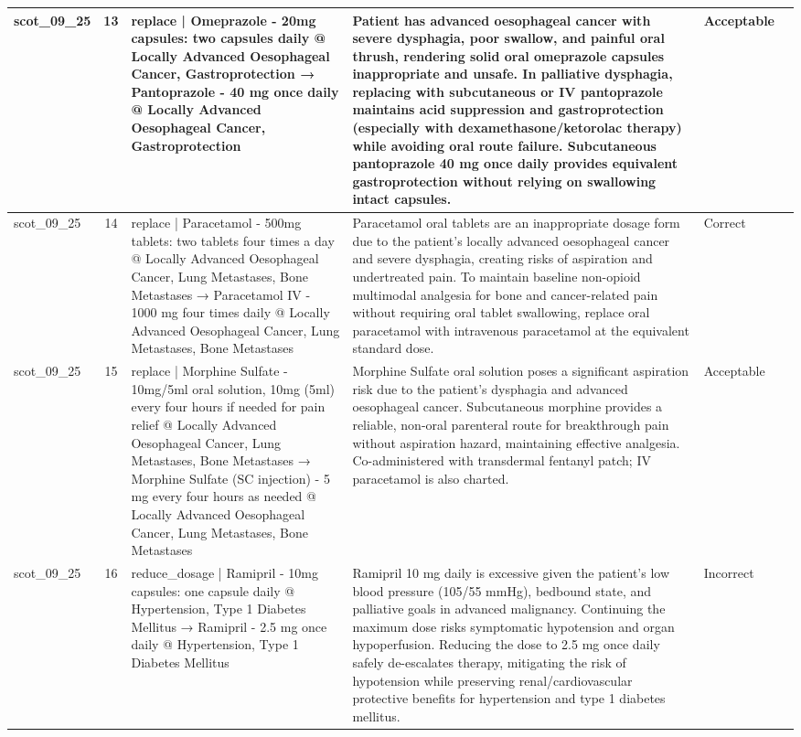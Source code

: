 \begin{longtable}{|p{1.45cm}|c|p{3.3cm}|p{6.5cm}|p{1.55cm}|p{2.3cm}|}
\hline
scot\_09\_25 & 13 & replace | Omeprazole - 20mg capsules: two capsules daily @ Locally Advanced Oesophageal Cancer, Gastroprotection → Pantoprazole - 40 mg once daily @ Locally Advanced Oesophageal Cancer, Gastroprotection & Patient has advanced oesophageal cancer with severe dysphagia, poor swallow, and painful oral thrush, rendering solid oral omeprazole capsules inappropriate and unsafe. In palliative dysphagia, replacing with subcutaneous or IV pantoprazole maintains acid suppression and gastroprotection (especially with dexamethasone/ketorolac therapy) while avoiding oral route failure. Subcutaneous pantoprazole 40 mg once daily provides equivalent gastroprotection without relying on swallowing intact capsules. & Acceptable &  \\
\hline
scot\_09\_25 & 14 & replace | Paracetamol - 500mg tablets: two tablets four times a day @ Locally Advanced Oesophageal Cancer, Lung Metastases, Bone Metastases → Paracetamol IV - 1000 mg four times daily @ Locally Advanced Oesophageal Cancer, Lung Metastases, Bone Metastases & Paracetamol oral tablets are an inappropriate dosage form due to the patient's locally advanced oesophageal cancer and severe dysphagia, creating risks of aspiration and undertreated pain. To maintain baseline non-opioid multimodal analgesia for bone and cancer-related pain without requiring oral tablet swallowing, replace oral paracetamol with intravenous paracetamol at the equivalent standard dose. & Correct &  \\
\hline
scot\_09\_25 & 15 & replace | Morphine Sulfate - 10mg/5ml oral solution, 10mg (5ml) every four hours if needed for pain relief @ Locally Advanced Oesophageal Cancer, Lung Metastases, Bone Metastases → Morphine Sulfate (SC injection) - 5 mg every four hours as needed @ Locally Advanced Oesophageal Cancer, Lung Metastases, Bone Metastases & Morphine Sulfate oral solution poses a significant aspiration risk due to the patient's dysphagia and advanced oesophageal cancer. Subcutaneous morphine provides a reliable, non-oral parenteral route for breakthrough pain without aspiration hazard, maintaining effective analgesia. Co-administered with transdermal fentanyl patch; IV paracetamol is also charted. & Acceptable &  \\
\hline
scot\_09\_25 & 16 & reduce\_dosage | Ramipril - 10mg capsules: one capsule daily @ Hypertension, Type 1 Diabetes Mellitus → Ramipril - 2.5 mg once daily @ Hypertension, Type 1 Diabetes Mellitus & Ramipril 10 mg daily is excessive given the patient's low blood pressure (105/55 mmHg), bedbound state, and palliative goals in advanced malignancy. Continuing the maximum dose risks symptomatic hypotension and organ hypoperfusion. Reducing the dose to 2.5 mg once daily safely de-escalates therapy, mitigating the risk of hypotension while preserving renal/cardiovascular protective benefits for hypertension and type 1 diabetes mellitus. & Incorrect &  \\

\end{longtable}
